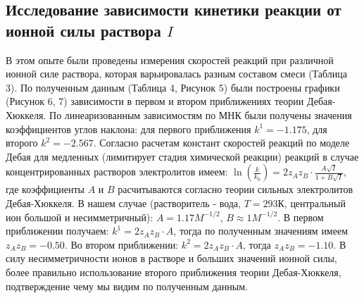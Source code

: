 \documentclass[a4paper,12pt]{article}
\begin{document}
\newpage

\subsection{Исследование зависимости кинетики реакции от ионной силы раствора $I$}

В этом опыте были проведены измерения скоростей реакций при
различной ионной силе раствора, которая варьировалась разным составом смеси (Таблица 3). По полученным данным (Таблица 4, Рисунок 5) были построены графики (Рисунок 6, 7) зависимости в первом и втором приближениях теории Дебая-Хюккеля. По линеаризованным зависимостям по МНК были получены значения коэффициентов углов наклона: для первого приближения $k^{1} = -1.175$, для второго $k^{2} = -2.567$. Согласно расчетам констант скоростей реакций по моделе Дебая для медленных (лимитирует стадия химической реакции) реакций в случае концентрированных растворов электролитов имеем: $\ln(\frac{k}{k_{0}}) = 2z_{A}z_{B} \cdot \frac{A \sqrt{I}}{1+B\sqrt{I}}$, где коэффициенты $A$ и $B$ расчитываются согласно теории сильных электролитов Дебая-Хюккеля. В нашем случае (растворитель - вода, $T = 293 К$, центральный ион большой и несимметричный): $A = 1.17 M^{-1/2}$, $B \approx 1 M^{-1/2}$. В первом приближении получаем: $k^{1} = 2z_{A}z_{B} \cdot A $, тогда по полученным значениям имеем $z_{A}z_{B} = -0.50 $. Во втором приближении: $k^{2} = 2z_{A}z_{B} \cdot A $, тогда $z_{A}z_{B} = -1.10$. В силу несимметричности ионов в растворе и больших значений ионной силы, более правильно использование второго приближения теории Дебая-Хюккеля, подтверждение чему мы видим по полученным данным.
 
\end{document}
